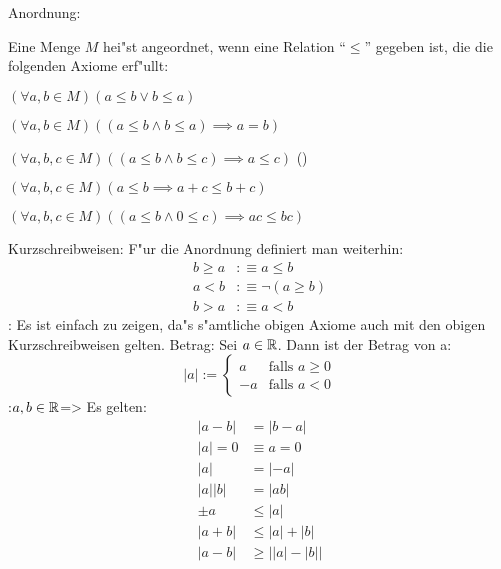  Anordnung:{
  Eine Menge $M$ hei"st angeordnet, wenn eine Relation ``$\le$'' gegeben
  ist, die die folgenden Axiome erf"ullt:
  \begin{stmts}
    \item $(\forall a,b \in M)(a \le b \lor b \le a)$
    \item $(\forall a,b \in M)((a \le b \land b \le a) \implies a=b)$ 
    \item $(\forall a,b,c \in M)((a \le b \land b \le c) \implies a \le c)$ 
      ()
    \item $(\forall a,b,c \in M)(a \le b \implies a+c \le b+c)$ 
    \item $(\forall a,b,c \in M)((a \le b \land 0 \le c) \implies ac \le bc)$ 
    \end{stmts}
  }
 Kurzschreibweisen:{
  F"ur die Anordnung definiert man weiterhin:
  \begin{align*}
    b \ge a &:\equiv a \le b \\
    a < b   &:\equiv \neg(a \ge b) \\
    b > a   &:\equiv a < b
    \end{align*}
  }
\remark:{
  Es ist einfach zu zeigen, da"s s"amtliche obigen Axiome auch mit den
  obigen Kurzschreibweisen gelten.
  }
 Betrag:{
  Sei $a \in\mathbb R$. Dann ist der Betrag von a:
  \[ |a|:=
    \begin{cases}
      a  & \text{falls $a \ge 0$} \\ 
      -a & \text{falls $a<0$}
    \end{cases}
  \]
}
\lessertheorem:$a,b \in\mathbb R$=>{
  Es gelten:
  \begin{align*}
    |a-b| &= |b-a| \\
    |a|=0 &\equiv a=0 \\
    |a|   &= |-a| \\
    |a||b| &= |ab| \\
    \pm a &\le |a| \\
    |a+b| &\le |a| + |b| \tag{Dreiecksungleichung} \\
    |a-b| &\ge \left| |a|-|b| \right|
    \end{align*}
  }
